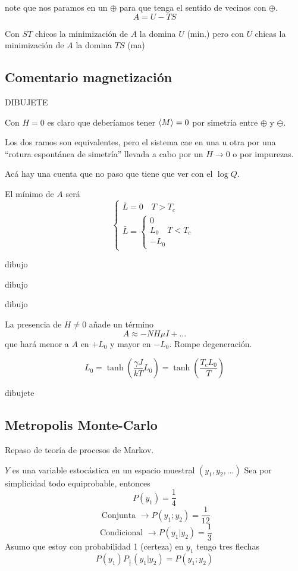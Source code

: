 \documentclass[10pt,oneside]{CBFT_book}
\begin{document}
 note que nos paramos en un $\oplus$ para que tenga el sentido de
vecinos con $\oplus$.
\[
	A = U - TS
\]

Con $ST$ chicos la minimización de $A$ la domina $U$ (min.) pero con $U$ chicas la minimización de $A$ la domina
$TS$ (ma)

\subsection{Comentario magnetización}

DIBUJETE

Con $H=0$ es claro que deberíamos tener $ \braket{M}=0 $ por simetría entre $\oplus$ y $\ominus$.

Los dos ramos son equivalentes, pero el sistema cae en una u otra por una ``rotura espontánea de simetría''
llevada a cabo por un $ H \to 0 $ o por impurezas.

Acá hay una cuenta que no paso que tiene que ver con el $ \log Q $.

El mínimo de $A$ será 
\[ 
	\begin{cases}
		\bar{L} = 0 \quad T > T_c \\
		\bar{L} = \begin{cases}
		0 		  \\
		L_0 \quad T < T_c \\
		-L_0
		\end{cases}
	\end{cases}
\]

dibujo

dibujo

dibujo


La presencia de $ H \neq 0 $ añade un término 
\[
	A \approx - N H \mu I + ...
\]
que hará menor a $ A $ en $ + L_0 $ y mayor en $ - L_0 $. Rompe degeneración.

\[
	L_0 = \tanh\left( \frac{\gamma J}{kT}L_0\right) = \tanh\left( \frac{T_c L_0}{T}\right)
\]

dibujete

\subsection{Metropolis Monte-Carlo}

Repaso de teoría de procesos de Markov.

$Y$ es una variable estocástica en un espacio muestral $(y_1, y_2,...)$
Sea por simplicidad todo equiprobable, entonces
\[
	P(y_1) = \frac{1}{4}
\]
\[
	\text{ Conjunta } \rightarrow P(y_1;y_2) = \frac{1}{12}
\]
\[
	\text{ Condicional } \rightarrow P(y_1|y_2) = \frac{1}{3}
\]
Asumo que estoy con probabilidad 1 (certeza) en $y_1$ tengo tres flechas
\[ 
	P(y_1) P_{\frac{1}{1}}(y_1|y_2) = P(y_1;y_2)
\]
\end{document}

